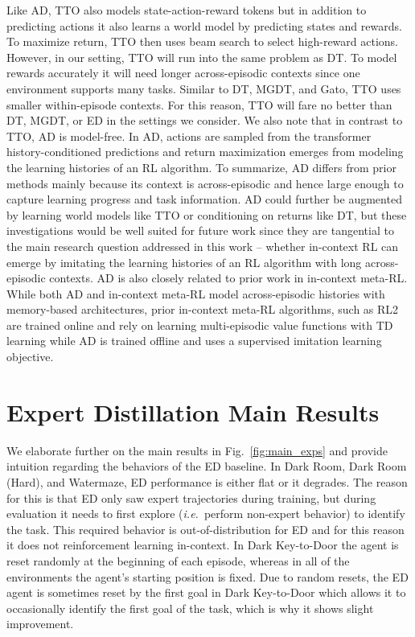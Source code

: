 \documentclass{article}
\theoremstyle{thm}
\newcommand{\name}{AD }
\newcommand{\namenospace}{AD}
\newcommand{\ie}{{\it i.e.}}
\begin{document}
 Like \namenospace, TTO also models state-action-reward tokens but in addition to predicting actions it also learns a world model by predicting states and rewards. To maximize return, TTO then uses beam search to select high-reward actions. However, in our setting, TTO will run into the same problem as DT. To model rewards accurately it will need longer across-episodic contexts since one environment supports many tasks. Similar to DT, MGDT, and Gato, TTO uses smaller within-episode contexts. For this reason, TTO will fare no better than DT, MGDT, or ED in the settings we consider. We also note that in contrast to TTO, \name is model-free. In \namenospace, actions are sampled from the transformer history-conditioned predictions and return maximization emerges from modeling the learning histories of an RL algorithm.
To summarize, \name differs from prior methods mainly because its context is across-episodic and hence large enough to capture learning progress and task information. \name could further be augmented by learning world models like TTO or conditioning on returns like DT, but these investigations would be well suited for future work since they are tangential to the main research question addressed in this work -- whether in-context RL can emerge by imitating the learning histories of an RL algorithm with long across-episodic contexts.
\name is also closely related to prior work in in-context meta-RL. While both \name and in-context meta-RL model across-episodic histories with memory-based architectures, prior in-context meta-RL algorithms, such as RL2~\citep{duan2016rl2} are trained online and rely on learning multi-episodic value functions with TD learning while \name is trained offline and uses a supervised imitation learning objective.
\section{Expert Distillation Main Results}
We elaborate further on the main results in Fig.~\ref{fig:main_exps} and provide intuition regarding the behaviors of the ED baseline.  In Dark Room, Dark Room (Hard), and Watermaze, ED performance is either flat or it degrades. The reason for this is that ED only saw expert trajectories during training, but during evaluation it needs to first explore (\ie \, perform non-expert behavior) to identify the task. This required behavior is out-of-distribution for ED and for this reason it does not reinforcement learning in-context. In Dark Key-to-Door the agent is reset randomly at the beginning of each episode, whereas in all of the environments the agent's starting position is fixed. Due to random resets, the ED agent is sometimes reset by the first goal in Dark Key-to-Door which allows it to occasionally identify the first goal of the task, which is why it shows slight improvement.
\end{document}
